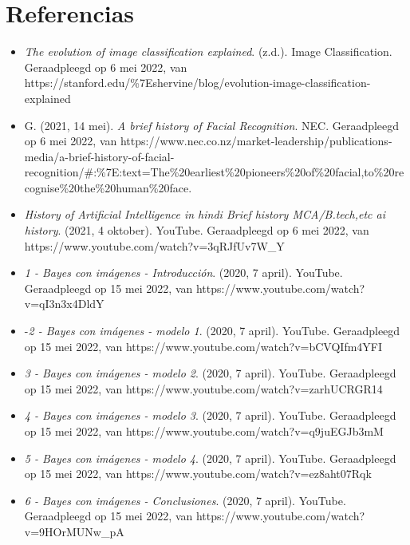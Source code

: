 \documentclass[
  spanish,
]{article}
\providecommand{\tightlist}{%
  \setlength{\itemsep}{0pt}\setlength{\parskip}{0pt}}
\begin{document}
\hypertarget{referencias}{%
\section{Referencias}\label{referencias}}

\begin{itemize}
\tightlist
\item
  \emph{The evolution of image classification explained}. (z.d.). Image
  Classification. Geraadpleegd op 6 mei 2022, van
  https://stanford.edu/\%7Eshervine/blog/evolution-image-classification-explained
\item
  G. (2021, 14 mei). \emph{A brief history of Facial Recognition}. NEC.
  Geraadpleegd op 6 mei 2022, van
  https://www.nec.co.nz/market-leadership/publications-media/a-brief-history-of-facial-recognition/\#:\%7E:text=The\%20earliest\%20pioneers\%20of\%20facial,to\%20recognise\%20the\%20human\%20face.
\item
  \emph{History of Artificial Intelligence in hindi \textbar{} Brief
  history \textbar{} MCA/B.tech,etc \textbar{} ai history}. (2021, 4
  oktober). YouTube. Geraadpleegd op 6 mei 2022, van
  https://www.youtube.com/watch?v=3qRJfUv7W\_Y
\item
  \emph{1 - Bayes con imágenes - Introducción}. (2020, 7 april).
  YouTube. Geraadpleegd op 15 mei 2022, van
  https://www.youtube.com/watch?v=qI3n3x4DldY
\item
  -\emph{2 - Bayes con imágenes - modelo 1}. (2020, 7 april). YouTube.
  Geraadpleegd op 15 mei 2022, van
  https://www.youtube.com/watch?v=bCVQIfm4YFI
\item
  \emph{3 - Bayes con imágenes - modelo 2}. (2020, 7 april). YouTube.
  Geraadpleegd op 15 mei 2022, van
  https://www.youtube.com/watch?v=zarhUCRGR14
\item
  \emph{4 - Bayes con imágenes - modelo 3}. (2020, 7 april). YouTube.
  Geraadpleegd op 15 mei 2022, van
  https://www.youtube.com/watch?v=q9juEGJb3mM
\item
  \emph{5 - Bayes con imágenes - modelo 4}. (2020, 7 april). YouTube.
  Geraadpleegd op 15 mei 2022, van
  https://www.youtube.com/watch?v=ez8aht07Rqk
\item
  \emph{6 - Bayes con imágenes - Conclusiones}. (2020, 7 april).
  YouTube. Geraadpleegd op 15 mei 2022, van
  https://www.youtube.com/watch?v=9HOrMUNw\_pA
\end{itemize}
\end{document}
